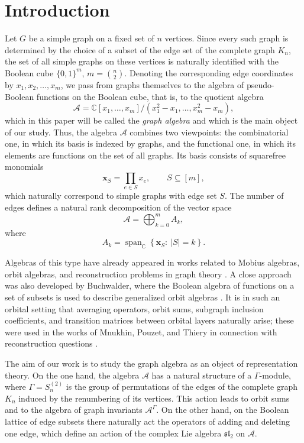 \documentclass[12pt,reqno]{amsart}
\begin{document}
\section{Introduction}

Let $G$ be a simple graph on a fixed set of $n$ vertices. Since every such
graph is determined by the choice of a subset of the edge set of the complete
graph $K_n$, the set of all simple graphs on these vertices is naturally
identified with the Boolean cube $\{0,1\}^m$,
$
m=\binom n2.
$
Denoting the corresponding edge coordinates by
$x_1,x_2,\ldots,x_m$, we pass from graphs themselves to the algebra of
pseudo-Boolean functions on the Boolean cube, that is, to the quotient algebra
$$
\mathcal A
=
\mathbb C[x_1,\dots,x_m]/(x_1^2-x_1,\dots,x_m^2-x_m),
$$
which in this paper will be called the \emph{graph algebra} and which is the
main object of our study. Thus, the algebra $\mathcal A$ combines two
viewpoints: the combinatorial one, in which its basis is indexed by graphs,
and the functional one, in which its elements are functions on the set of all
graphs. Its basis consists of squarefree monomials
$$
\boldsymbol{x}_S=\prod_{e\in S}x_e,\qquad S\subseteq [m],
$$
which naturally correspond to simple graphs with edge set $S$. The number of
edges defines a natural rank decomposition of the vector space
$$
\mathcal A
=
\bigoplus_{k=0}^{m} A_k,
$$
where
$$
A_k
=
\operatorname{span}_{\mathbb C}
\left\{
\boldsymbol{x}_S:\ |S|=k
\right\}.
$$

Algebras of this type have already appeared in works related to Mobius
algebras, orbit algebras, and reconstruction problems in graph theory
\cite{Mnukhin1992,MnukhinMobius}. A close approach was also developed by
Buchwalder, where the Boolean algebra of functions on a set of subsets is used
to describe generalized orbit algebras \cite{Buch,Buchwalder2010}. It is in
such an orbital setting that averaging operators, orbit sums, subgraph
inclusion coefficients, and transition matrices between orbital layers
naturally arise; these were used in the works of Mnukhin, Pouzet, and Thiery
in connection with reconstruction questions \cite{Mnukhin1992,PT}.

The aim of our work is to study the graph algebra as an object of
representation theory. On the one hand, the algebra $\mathcal A$ has a natural
structure of a $\Gamma$-module, where $\Gamma=S_n^{(2)}$ is the group of
permutations of the edges of the complete graph $K_n$ induced by the
renumbering of its vertices. This action leads to orbit sums and to the
algebra of graph invariants $\mathcal A^\Gamma$. On the other hand, on the
Boolean lattice of edge subsets there naturally act the operators of adding
and deleting one edge, which define an action of the complex Lie algebra
$\mathfrak{sl}_2$ on $\mathcal A$.
\end{document}
